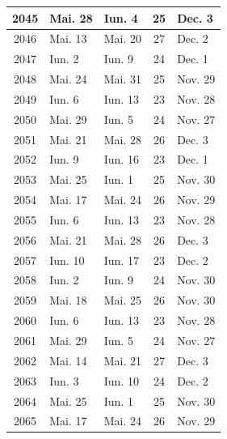 \begin{center}
\begin{tabular}{|c|l|l|c|l|}
2045 & Mai. 28 & Iun. 4 & 25 & Dec. 3 \\
\hline
2046 & Mai. 13 & Mai. 20 & 27 & Dec. 2 \\
2047 & Iun. 2 & Iun. 9 & 24 & Dec. 1 \\
2048 & Mai. 24 & Mai. 31 & 25 & Nov. 29 \\
2049 & Iun. 6 & Iun. 13 & 23 & Nov. 28 \\
2050 & Mai. 29 & Iun. 5 & 24 & Nov. 27 \\
\hline
2051 & Mai. 21 & Mai. 28 & 26 & Dec. 3 \\
2052 & Iun. 9 & Iun. 16 & 23 & Dec. 1 \\
2053 & Mai. 25 & Iun. 1 & 25 & Nov. 30 \\
2054 & Mai. 17 & Mai. 24 & 26 & Nov. 29 \\
2055 & Iun. 6 & Iun. 13 & 23 & Nov. 28 \\
\hline
2056 & Mai. 21 & Mai. 28 & 26 & Dec. 3 \\
2057 & Iun. 10 & Iun. 17 & 23 & Dec. 2 \\
2058 & Iun. 2 & Iun. 9 & 24 & Nov. 30 \\
2059 & Mai. 18 & Mai. 25 & 26 & Nov. 30 \\
2060 & Iun. 6 & Iun. 13 & 23 & Nov. 28 \\
\hline
2061 & Mai. 29 & Iun. 5 & 24 & Nov. 27 \\
2062 & Mai. 14 & Mai. 21 & 27 & Dec. 3 \\
2063 & Iun. 3 & Iun. 10 & 24 & Dec. 2 \\
2064 & Mai. 25 & Iun. 1 & 25 & Nov. 30 \\
2065 & Mai. 17 & Mai. 24 & 26 & Nov. 29 \\


\end{tabular}
\end{center}
